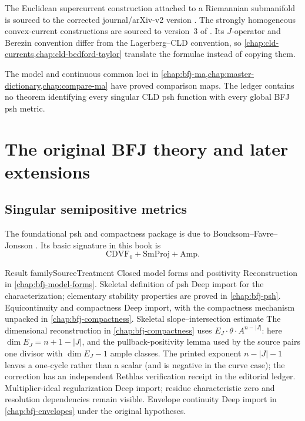 The Euclidean supercurrent construction attached to a Riemannian
submanifold is sourced to the corrected journal/arXiv-v2 version
\cite{Ber19Super}.  The strongly homogeneous convex-current constructions
are sourced to version~3 of \cite{Ber26Convex}.  Its \(J\)-operator and
Berezin convention differ from the Lagerberg--CLD convention, so
\cref{chap:cld-currents,chap:cld-bedford-taylor} translate the formulae
instead of copying them.

\begin{remark}
\label{rem:appL-cld-bfj-boundary}
The model and continuous common loci in
\cref{chap:bfj-ma,chap:master-dictionary,chap:compare-ma} have proved
comparison maps.  The ledger contains no theorem identifying every singular
CLD psh function with every global BFJ psh metric.
\end{remark}

\section{The original BFJ theory and later extensions}
\label{sec:appL-bfj}

\subsection{Singular semipositive metrics}
\label{sec:appL-bfj-singular}

The foundational psh and compactness package is due to
Boucksom--Favre--Jonsson \cite{BFJ16}.  Its basic signature in this book is
\[
       \mathrm{CDVF}_0+\mathrm{SmProj}+\mathrm{Amp}.
\tag{L.4}\label{eq:appL-bfj-signature}
\]

\begin{AppLProvenanceLedger}{Result family}{Source}{Treatment}
\AppLProvenanceRecord
  {Closed model forms and positivity}
  {\cite[\S\S2--5]{BFJ16}}
  {Reconstruction in \cref{chap:bfj-model-forms}.}
\AppLProvenanceRecord
  {Skeletal definition of psh}
  {\cite[\S7]{BFJ16}}
  {Deep import for the characterization; elementary stability properties
   are proved in \cref{chap:bfj-psh}.}
\AppLProvenanceRecord
  {Equicontinuity and compactness}
  {\cite[\S\S6--7]{BFJ16}}
  {Deep import, with the compactness mechanism unpacked in
   \cref{chap:bfj-compactness}.}
\AppLProvenanceRecord
  {Skeletal slope--intersection estimate}
  {\cite[\S6, display~(6.3)]{BFJ16}}
  {The dimensional reconstruction in \cref{chap:bfj-compactness} uses
   \(E_J\cdot\theta\cdot A^{n-|J|}\): here
   \(\dim E_J=n+1-|J|\), and the pullback-positivity lemma used by the
   source pairs one divisor with \(\dim E_J-1\) ample classes.  The printed
   exponent \(n-|J|-1\) leaves a one-cycle rather than a scalar (and is
   negative in the curve case); the correction has an independent Rethlas
   verification receipt in the editorial ledger.}
\AppLProvenanceRecord
  {Multiplier-ideal regularization}
  {\cite[\S8 and Appendix~B]{BFJ16}}
  {Deep import; residue characteristic zero and resolution dependencies
   remain visible.}
\AppLProvenanceRecord
  {Envelope continuity}
  {\cite[\S8]{BFJ16}}
  {Deep import in \cref{chap:bfj-envelopes} under the original hypotheses.}
\end{AppLProvenanceLedger}

